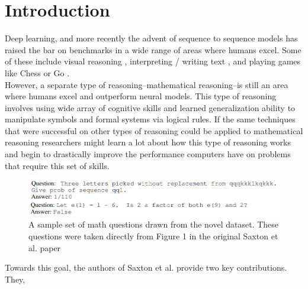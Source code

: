 










\section{Introduction}

Deep learning, and more recently the advent of sequence to sequence models has raised the bar on benchmarks in a wide range of areas where humans excel. Some of these include visual reasoning \supercite{voulodimos2018deep}, interpreting / writing text \supercite{radford2019language}, and playing games like Chess or Go \supercite{silver2017mastering}. \\ 

However, a separate type of reasoning--mathematical reasoning--is still an area where humans excel and outperform neural models. This type of reasoning involves using  wide array of cognitive skills and learned generalization ability to manipulate symbols and formal systems via logical rules. If the same techniques that were successful on other types of reasoning could be applied to mathematical reasoning researchers might learn a lot about how this type of reasoning works and begin to drastically improve the performance computers have on problems that require this set of skills. \\ 

\begin{figure}[hbt!]
\includegraphics[width=12cm]{images/math_examples_bunch_reduced.PNG}
\centering
\caption{A sample set of math questions drawn from the novel dataset. These questions were taken directly from Figure 1 in the original Saxton et al. paper \supercite{DBLP:journals/corr/abs-1904-01557}}
\label{fig:mathexamples}
\end{figure}

Towards this goal, the authors of Saxton et al. \supercite{DBLP:journals/corr/abs-1904-01557}  provide two key contributions. They, 

